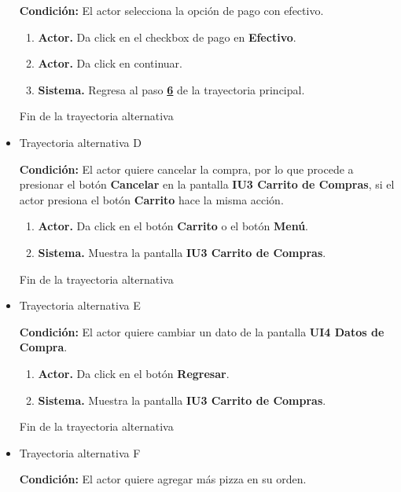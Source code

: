 \begin{itemize}
	\noindent \textbf{Condición:} El actor selecciona la opción de pago con efectivo.
	
	\begin{enumerate}
		\item \textbf{Actor.}  Da click en el checkbox de pago en \textbf{Efectivo}.
		\item \textbf{Actor.} Da click en continuar. 
		\item \textbf{Sistema.} Regresa al paso \hyperlink{p6}{\textbf{6}} de la trayectoria principal.
	\end{enumerate}
	
	Fin de la trayectoria alternativa
	
	\item \hypertarget{TAD:CU4}{Trayectoria alternativa D}
	
	\noindent \textbf{Condición:} El actor quiere cancelar la compra, por lo que procede a presionar el botón \textbf{Cancelar} en la pantalla \textbf{IU3 Carrito de Compras}, si el actor presiona el botón \textbf{Carrito} hace la misma acción.
	
	\begin{enumerate}
		\item \textbf{Actor.} Da click en el botón \textbf{Carrito} o el botón \textbf{Menú}.
		\item \textbf{Sistema.} Muestra la pantalla \textbf{IU3 Carrito de Compras}.
	\end{enumerate}
	
	Fin de la trayectoria alternativa
	
	\item \hypertarget{TAE:CU4}{Trayectoria alternativa E}
	
	\noindent \textbf{Condición:} El actor quiere cambiar un dato de la pantalla \textbf{UI4 Datos de Compra}.
	
	\begin{enumerate}
		\item \textbf{Actor.} Da click en el botón \textbf{Regresar}.
		\item \textbf{Sistema.} Muestra la pantalla \textbf{IU3 Carrito de Compras}.
	\end{enumerate}
	
	Fin de la trayectoria alternativa
	
	\item \hypertarget{TAF:CU4}{Trayectoria alternativa F}
	
	\noindent \textbf{Condición:} El actor quiere agregar más pizza en su orden.
	

\end{itemize}
